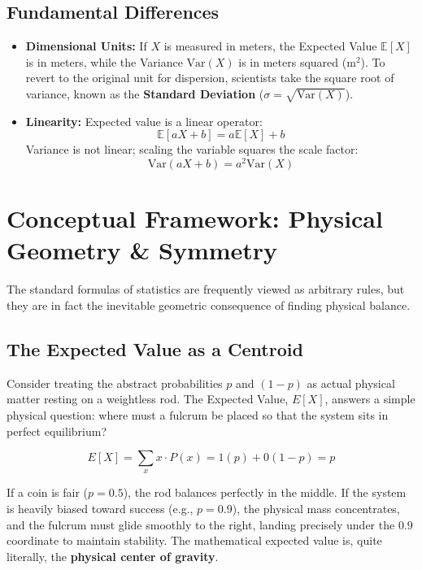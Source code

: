 \documentclass[12pt]{article}
\newcommand{\purplehighlight}[1]{\textcolor{purplehl}{\textbf{#1}}}
\begin{document}
\subsection*{Fundamental Differences}
\begin{itemize}
    \item \textbf{Dimensional Units:} If $X$ is measured in meters, the Expected Value $\mathbb{E}[X]$ is in meters, while the Variance $\text{Var}(X)$ is in meters squared ($\text{m}^2$). To revert to the original unit for dispersion, scientists take the square root of variance, known as the \textbf{Standard Deviation} ($\sigma = \sqrt{\text{Var}(X)}$).
    
    \item \textbf{Linearity:} Expected value is a linear operator:
    \[
    \mathbb{E}[aX + b] = a\mathbb{E}[X] + b
    \]
    Variance is not linear; scaling the variable squares the scale factor:
    \[
    \text{Var}(aX + b) = a^2\text{Var}(X)
    \]
\end{itemize}

\newpage

\section{Conceptual Framework: Physical Geometry \& Symmetry}
The standard formulas of statistics are frequently viewed as arbitrary rules, but they are in fact the inevitable geometric consequence of finding physical balance.

\subsection{The Expected Value as a Centroid}
Consider treating the abstract probabilities $p$ and $(1-p)$ as actual physical matter resting on a weightless rod. The Expected Value, $E[X]$, answers a simple physical question: where must a fulcrum be placed so that the system sits in perfect equilibrium?

\begin{goldformula}
\begin{equation}
E[X] = \sum_{x} x \cdot P(x) = 1(p) + 0(1 - p) = p
\end{equation}
\end{goldformula}

If a coin is fair ($p = 0.5$), the rod balances perfectly in the middle. If the system is heavily biased toward success (e.g., $p = 0.9$), the physical mass concentrates, and the fulcrum must glide smoothly to the right, landing precisely under the $0.9$ coordinate to maintain stability. The mathematical expected value is, quite literally, the \purplehighlight{physical center of gravity}.
\end{document}
